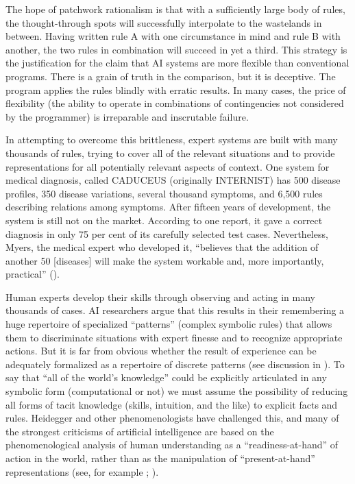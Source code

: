 \documentclass[12pt]{article}
\begin{document}
The hope of patchwork rationalism is that with a sufficiently large body of rules, the thought-through spots will successfully interpolate to the wastelands in between. Having written rule A with one circumstance in mind and rule B with another, the two rules in combination will succeed in yet a third. This strategy is the justification for the claim that AI systems are more flexible than conventional programs. There is a grain of truth in the comparison, but it is deceptive. The program applies the rules blindly with erratic results. In many cases, the price of flexibility (the ability to operate in combinations of contingencies not considered by the programmer) is irreparable and inscrutable failure.

In attempting to overcome this brittleness, expert systems are built with many thousands of rules, trying to cover all of the relevant situations and to provide representations for all potentially relevant aspects of context. One system for medical diagnosis, called CADUCEUS (originally INTERNIST) has 500 disease profiles, 350 disease variations, several thousand symptoms, and 6,500 rules describing relations among symptoms. After fifteen years of development, the system is still not on the market. According to one report, it gave a correct diagnosis in only 75 per cent of its carefully selected test cases. Nevertheless, Myers, the medical expert who developed it, ``believes that the addition of another 50 [diseases] will make the system workable and, more importantly, practical'' (\cite{newquist1987}).

Human experts develop their skills through observing and acting in many
thousands of cases. AI researchers argue that this results in their remembering a huge repertoire of specialized ``patterns'' (complex symbolic rules) that allows them to discriminate situations with expert finesse and to recognize appropriate actions. But it is far from obvious whether the result of experience can be adequately formalized as a repertoire of discrete patterns (see discussion in \cite{dreyfus1986}). To say that ``all of the world's knowledge'' could be explicitly articulated in any symbolic form (computational or not) we must assume the possibility of reducing all forms of tacit knowledge (skills, intuition, and the like) to explicit facts and rules. Heidegger and other phenomenologists have challenged this, and many of the strongest criticisms of artificial intelligence are based on the phenomenological analysis of human understanding as a ``readiness-at-hand'' of action in the world, rather than as the manipulation of ``present-at-hand'' representations (see, for example \cite{dreyfus1979}; \cite{winograd1986}).
\end{document}
